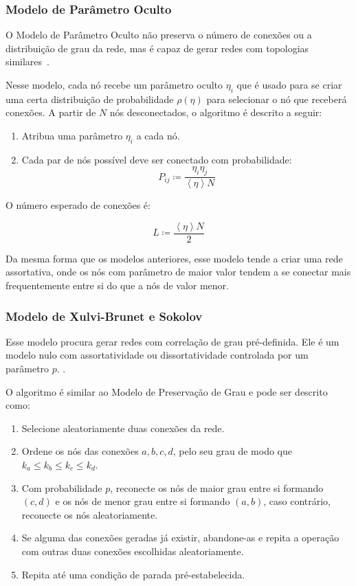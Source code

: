 \documentclass[12pt,a4paper,final]{article}
\newcommand{\avg}[1]{\left\langle #1 \right\rangle} %
\newcommand{\defn}{\coloneqq} %
\begin{document}
\subsubsection{Modelo de Parâmetro Oculto}

O Modelo de Parâmetro Oculto não preserva o número de conexões ou a distribuição de grau da rede, mas é capaz de gerar redes com topologias similares~\cite{Barabasi2016-rn}.

Nesse modelo, cada nó recebe um parâmetro oculto $\eta_i$ que é usado para se criar uma certa distribuição de probabilidade $\rho(\eta)$ para selecionar o nó que receberá conexões. A partir de $N$ nós desconectados, o algoritmo é descrito a seguir:

\begin{enumerate}
\item Atribua uma parâmetro $\eta_i$ a cada nó.
\item Cada par de nós possível deve ser conectado com probabilidade:
\begin{equation}
P_{ij} \defn \frac{\eta_i \eta_j}{\avg{\eta}N}
\end{equation}
\end{enumerate}

O número esperado de conexões é:

\begin{equation}
L \defn \frac{\avg{\eta}N}{2} 
\end{equation}

Da mesma forma que os modelos anteriores, esse modelo tende a criar uma rede assortativa, onde os nós com parâmetro de maior valor tendem a se conectar mais frequentemente entre si do que a nós de valor menor.

\subsubsection{Modelo de Xulvi-Brunet e Sokolov}

Esse modelo procura gerar redes com correlação de grau pré-definida. Ele é um modelo nulo com assortatividade ou dissortatividade controlada por um parâmetro $p$. \cite{Xulvi-Brunet2004-qg}.

O algoritmo é similar ao Modelo de Preservação de Grau e pode ser descrito como:

\begin{enumerate}
\item Selecione aleatoriamente duas conexões da rede.
\item Ordene os nós das conexões $a, b, c, d$, pelo seu grau de modo que $k_a \le k_b \le k_c \le k_d$.
\item Com probabilidade $p$, reconecte os nós de maior grau entre si formando $(c, d)$ e os nós de menor grau entre si formando $(a, b)$, caso contrário, reconecte os nós aleatoriamente.
\item Se alguma das conexões geradas já existir, abandone-as e repita a operação com outras duas conexões escolhidas aleatoriamente.
\item Repita até uma condição de parada pré-estabelecida.  
\end{enumerate}
 
\end{document}
